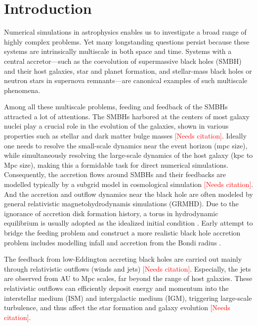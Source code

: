 \documentclass{article}
\newcommand{\red}{\textcolor{red}}
\newcommand{\AddCite}{\red{[Needs citation]}}
\newcommand{\hywcom}[1]{{\color{purple}{[HYW: #1]}}}
\begin{document}
\begin{CJK*}{UTF8}{gbsn}

\end{CJK*}

\section{Introduction}

\hywcom{Multiscale problems.}
Numerical simulations in astrophysics enables us to investigate a broad range of highly complex problems.
Yet many longstanding questions persist because these systems are intrinsically multiscale in both space and time.
Systems with a central accretor—such as the coevolution of supermassive black holes (SMBH) and their host galaxies, star and planet formation, and stellar-mass black holes or neutron stars in supernova remnants—are canonical examples of such multiscale phenomena.

Among all these multiscale problems, feeding and feedback of the SMBHs attracted a lot of attentions.
The SMBHs harbored at the centers of most galaxy nuclei play a crucial role in the evolution of the galaxies, shown in various properties such as stellar and dark matter bulge masses \AddCite.
Ideally one needs to resolve the small-scale dynamics near the event horizon (mpc size), while simultaneously
resolving the large-scale dynamics of the host galaxy (kpc to Mpc size),
making this a formidable task for direct numerical simulations.
Consequently, the accretion flows around SMBHs and their feedbacks are modelled typically by a subgrid model in cosmological simulation \AddCite. 
And the accretion and outflow dynamics near the black hole are often modeled by general relativistic magnetohydrodynamis simulations (GRMHD).
Due to the ignorance of accretion disk formation history, a torus in hydrodynamic equilibrium is usually adopted as the idealized initial condition \cite{1976ApJ...207..962F}.
Early attempt to bridge the feeding problem and construct a more realistic black hole accretion problem includes modelling infall and accretion from the Bondi radius \cite{Bondi:1952MNRAS.112..195B}.

\hywcom{Relativistic outflows.}
The feedback from low-Eddington accreting black holes are carried out mainly through relativistic outflows (winds and jets) \AddCite.
Especially, the jets are observed from AU to Mpc scales, far beyond the range of host galaxies. 
These relativistic outflows can efficiently deposit energy and momentum into the interstellar medium (ISM) and intergalactic medium (IGM), triggering large-scale turbulence, and thus affect the star formation and galaxy evolution \AddCite.
\end{document}

